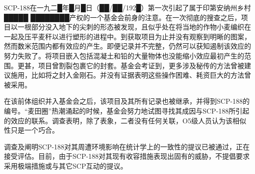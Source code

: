 SCP-188在一九二█年█月█日（██\slash ██\slash 192█）第一次引起了属于印第安纳州乡村█████ ████████产权的一个基金会前身的注意。在一次彻底的搜查之后，项目以一根部分没入地下的尖刺的形态被发现，且似乎处在将当地的作物小麦编织在一起及压平麦秆以进行塑形的进程中。到获取项目为止并没有观察到明晰的图案，然而数米范围内都有效应的产生。即便记录并不完整，仍然可以获知遏制该效应的努力失败了。将项目嵌入包括混凝土和铅的大量物体也没能缩小效应最初产生的范围。更甚，项目曾割裂包裹它的封套。基金会考证到，更多涉及秘传的方法曾被建议施用，比如将之封入金刚石。并没有证据表明这些操作困难、耗资巨大的方法曾被采用。

在该前体组织并入基金会之后，该项目及其所有记录也被继承，并得到SCP-188的编号。“麦田圈”热潮涌起的时候，基金会努力地试图寻找其成因与SCP-188所引起的效应的联系。调查表明，除了表象，二者没有任何关联，O5级人员认为该相似性只是一个巧合。

调查及阐明SCP-188对其周遭环境影响在统计学上的一致性的提议已被通过，正在接受评估。目前，由于SCP-188对其现有收容措施表现出固有的威胁，不提倡要求采用极端措施或与其它SCP互动的提议。
